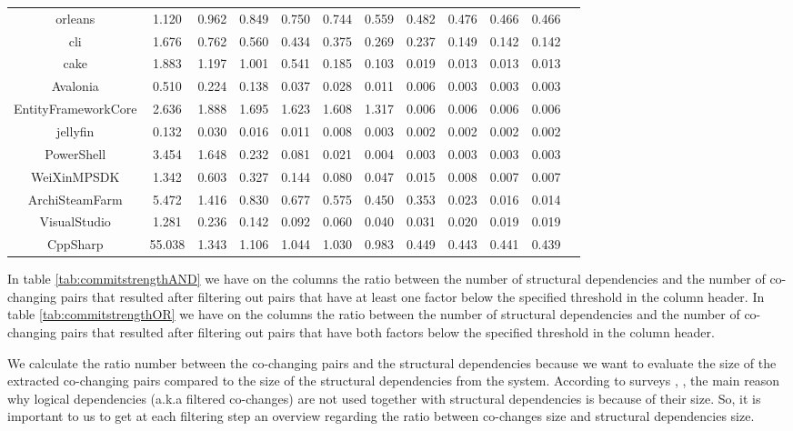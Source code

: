 \begin{table}[!h]
{\begin{tabular}{|c|cccccccccc|c|}
orleans	&	1.120	&	0.962	&	0.849	&	0.750	&	0.744	&	0.559	&	0.482	&	0.476	&	0.466	&	0.466	\\
cli	&	1.676	&	0.762	&	0.560	&	0.434	&	0.375	&	0.269	&	0.237	&	0.149	&	0.142	&	0.142	\\
cake	&	1.883	&	1.197	&	1.001	&	0.541	&	0.185	&	0.103	&	0.019	&	0.013	&	0.013	&	0.013	\\
Avalonia	&	0.510	&	0.224	&	0.138	&	0.037	&	0.028	&	0.011	&	0.006	&	0.003	&	0.003	&	0.003	\\
EntityFrameworkCore	&	2.636	&	1.888	&	1.695	&	1.623	&	1.608	&	1.317	&	0.006	&	0.006	&	0.006	&	0.006	\\
jellyfin	&	0.132	&	0.030	&	0.016	&	0.011	&	0.008	&	0.003	&	0.002	&	0.002	&	0.002	&	0.002	\\
PowerShell	&	3.454	&	1.648	&	0.232	&	0.081	&	0.021	&	0.004	&	0.003	&	0.003	&	0.003	&	0.003	\\
WeiXinMPSDK	&	1.342	&	0.603	&	0.327	&	0.144	&	0.080	&	0.047	&	0.015	&	0.008	&	0.007	&	0.007	\\
ArchiSteamFarm	&	5.472	&	1.416	&	0.830	&	0.677	&	0.575	&	0.450	&	0.353	&	0.023	&	0.016	&	0.014	\\
VisualStudio	&	1.281	&	0.236	&	0.142	&	0.092	&	0.060	&	0.040	&	0.031	&	0.020	&	0.019	&	0.019	\\
CppSharp	&	55.038	&	1.343	&	1.106	&	1.044	&	1.030	&	0.983	&	0.449	&	0.443	&	0.441	&	0.439	\\


\hline
\end{tabular}
}
\end{table}


In table \ref{tab:commitstrengthAND} we have on the columns the ratio between the number of structural dependencies and the number of co-changing pairs that resulted after filtering out pairs that have at least one factor below the specified threshold in the column header.
In table \ref{tab:commitstrengthOR} we have on the columns the ratio between the number of structural dependencies and the number of co-changing pairs that resulted after filtering out pairs that have both factors below the specified threshold in the column header.

We calculate the ratio number between the co-changing pairs and the structural dependencies because we want to evaluate the size of the extracted co-changing pairs compared to the size of the structural dependencies from the system. 
According to surveys \cite{Shtern:2012:CMS:2332427.2332428}, \cite{sar}, the main reason why logical dependencies (a.k.a filtered co-changes) are not used together with structural dependencies is because of their size. So, it is important to us to get at each filtering step an overview regarding the ratio between co-changes size and structural dependencies size.

